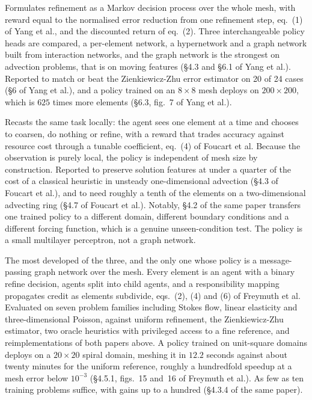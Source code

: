 \documentclass[11pt, a4paper]{article}
\begin{document}
\begin{description}[style=nextline]
  \item[Yang et al.~\citep{rlamr1}]
  Formulates refinement as a Markov decision process over the whole mesh,
  with reward equal to the normalised error reduction from one refinement
  step, eq.~(1) of Yang et al., and the discounted return of eq.~(2). Three
  interchangeable policy heads are compared, a per-element network, a
  hypernetwork and a graph network built from interaction networks, and the
  graph network is the strongest on advection problems, that is on moving
  features (\S{}4.3 and \S{}6.1 of Yang et al.). Reported to match or beat the
  Zienkiewicz-Zhu error estimator on 20 of 24 cases (\S{}6 of Yang et al.), and
  a policy trained on an $8 \times 8$ mesh deploys on $200 \times 200$,
  which is $625$ times more elements (\S{}6.3, fig.~7 of Yang et al.).
  \item[Foucart, Charous and Lermusiaux~\citep{rlamr2}]
  Recasts the same task locally: the agent sees one element at a time and
  chooses to coarsen, do nothing or refine, with a reward that trades
  accuracy against resource cost through a tunable coefficient, eq.~(4) of
  Foucart et al. Because the observation is purely local, the policy is
  independent of mesh size by construction. Reported to preserve solution
  features at under a quarter of the cost of a classical heuristic in
  unsteady one-dimensional advection (\S{}4.3 of Foucart et al.), and to need
  roughly a tenth of the elements on a two-dimensional advecting ring (\S{}4.7
  of Foucart et al.). Notably, \S{}4.2 of the same paper transfers one trained
  policy to a different domain, different boundary conditions and a
  different forcing function, which is a genuine unseen-condition test. The
  policy is a small multilayer perceptron, not a graph network.
  \item[Freymuth et al., swarm refinement~\citep{rlswarm}]
  The most developed of the three, and the only one whose policy is a
  message-passing graph network over the mesh. Every element is an agent
  with a binary refine decision, agents split into child agents, and a
  responsibility mapping propagates credit as elements subdivide, eqs.~(2),
  (4) and (6) of Freymuth et al. Evaluated on seven problem families
  including Stokes flow, linear elasticity and three-dimensional Poisson,
  against uniform refinement, the Zienkiewicz-Zhu estimator, two oracle
  heuristics with privileged access to a fine reference, and
  reimplementations of both papers above. A policy trained on unit-square
  domains deploys on a $20 \times 20$ spiral domain, meshing it in $12.2$
  seconds against about twenty minutes for the uniform reference, roughly a
  hundredfold speedup at a mesh error below $10^{-3}$ (\S{}4.5.1, figs.~15
  and~16 of Freymuth et al.). As few as ten training problems suffice, with
  gains up to a hundred (\S{}4.3.4 of the same paper).
\end{description}
\end{document}
